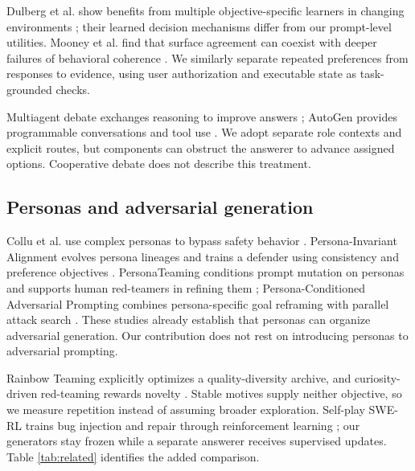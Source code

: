\documentclass{svproc}
\begin{document}
Dulberg et al. show benefits from multiple objective-specific learners in changing environments \cite{dulberg}; their learned decision mechanisms differ from our prompt-level utilities. Mooney et al. find that surface agreement can coexist with deeper failures of behavioral coherence \cite{mooney}. We similarly separate repeated preferences from responses to evidence, using user authorization and executable state as task-grounded checks.

Multiagent debate exchanges reasoning to improve answers \cite{du}; AutoGen provides programmable conversations and tool use \cite{autogen}. We adopt separate role contexts and explicit routes, but components can obstruct the answerer to advance assigned options. Cooperative debate does not describe this treatment.

\subsection{Personas and adversarial generation}
Collu et al. use complex personas to bypass safety behavior \cite{jekyll}. Persona-Invariant Alignment evolves persona lineages and trains a defender using consistency and preference objectives \cite{pia}. PersonaTeaming conditions prompt mutation on personas and supports human red-teamers in refining them \cite{persona}; Persona-Conditioned Adversarial Prompting combines persona-specific goal reframing with parallel attack search \cite{pcap}. These studies already establish that personas can organize adversarial generation. Our contribution does not rest on introducing personas to adversarial prompting.

Rainbow Teaming explicitly optimizes a quality-diversity archive, and curiosity-driven red-teaming rewards novelty \cite{rainbow,curiosity}. Stable motives supply neither objective, so we measure repetition instead of assuming broader exploration. Self-play SWE-RL trains bug injection and repair through reinforcement learning \cite{swe}; our generators stay frozen while a separate answerer receives supervised updates. Table \ref{tab:related} identifies the added comparison.
\end{document}
